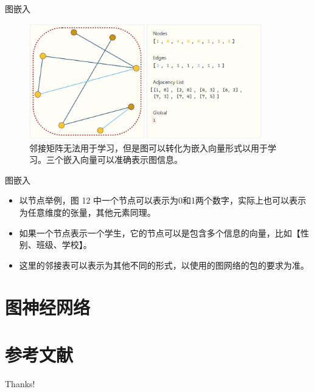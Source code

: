 \documentclass{beamer}
\begin{document}
\begin{frame}{图嵌入}
    \begin{figure}
        \includegraphics[width=0.9\textwidth]{图嵌入.jpg}
        \caption{邻接矩阵无法用于学习，但是图可以转化为嵌入向量形式以用于学习。三个嵌入向量可以准确表示图信息。}
    \end{figure}
\end{frame}

\begin{frame}{图嵌入}
    \begin{itemize}[<+-| alert@+>]
        \item 以节点举例，图 12 中一个节点可以表示为0和1两个数字，实际上也可以表示为任意维度的张量，其他元素同理。
        \item 如果一个节点表示一个学生，它的节点可以是包含多个信息的向量，比如【性别、班级、学校】。
        \item 这里的邻接表可以表示为其他不同的形式，以使用的图网络的包的要求为准。
    \end{itemize}
\end{frame}

\section{图神经网络}

\begin{frame}

\end{frame}

\section{参考文献}

\begin{frame} %
    
    
\end{frame}

\begin{frame}
    \begin{center}
        {\Huge\calligra Thanks!}
    \end{center}
\end{frame}
\end{document}
